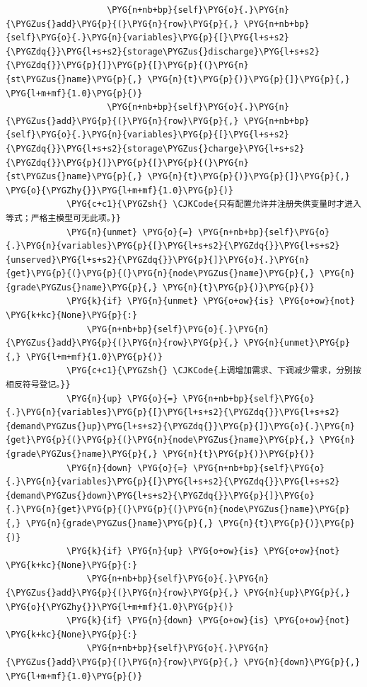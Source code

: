 \begin{Verbatim}
                    \PYG{n+nb+bp}{self}\PYG{o}{.}\PYG{n}{\PYGZus{}add}\PYG{p}{(}\PYG{n}{row}\PYG{p}{,} \PYG{n+nb+bp}{self}\PYG{o}{.}\PYG{n}{variables}\PYG{p}{[}\PYG{l+s+s2}{\PYGZdq{}}\PYG{l+s+s2}{storage\PYGZus{}discharge}\PYG{l+s+s2}{\PYGZdq{}}\PYG{p}{]}\PYG{p}{[}\PYG{p}{(}\PYG{n}{st\PYGZus{}name}\PYG{p}{,} \PYG{n}{t}\PYG{p}{)}\PYG{p}{]}\PYG{p}{,} \PYG{l+m+mf}{1.0}\PYG{p}{)}
                    \PYG{n+nb+bp}{self}\PYG{o}{.}\PYG{n}{\PYGZus{}add}\PYG{p}{(}\PYG{n}{row}\PYG{p}{,} \PYG{n+nb+bp}{self}\PYG{o}{.}\PYG{n}{variables}\PYG{p}{[}\PYG{l+s+s2}{\PYGZdq{}}\PYG{l+s+s2}{storage\PYGZus{}charge}\PYG{l+s+s2}{\PYGZdq{}}\PYG{p}{]}\PYG{p}{[}\PYG{p}{(}\PYG{n}{st\PYGZus{}name}\PYG{p}{,} \PYG{n}{t}\PYG{p}{)}\PYG{p}{]}\PYG{p}{,} \PYG{o}{\PYGZhy{}}\PYG{l+m+mf}{1.0}\PYG{p}{)}
            \PYG{c+c1}{\PYGZsh{} \CJKCode{只有配置允许并注册失供变量时才进入等式；严格主模型可无此项。}}
            \PYG{n}{unmet} \PYG{o}{=} \PYG{n+nb+bp}{self}\PYG{o}{.}\PYG{n}{variables}\PYG{p}{[}\PYG{l+s+s2}{\PYGZdq{}}\PYG{l+s+s2}{unserved}\PYG{l+s+s2}{\PYGZdq{}}\PYG{p}{]}\PYG{o}{.}\PYG{n}{get}\PYG{p}{(}\PYG{p}{(}\PYG{n}{node\PYGZus{}name}\PYG{p}{,} \PYG{n}{grade\PYGZus{}name}\PYG{p}{,} \PYG{n}{t}\PYG{p}{)}\PYG{p}{)}
            \PYG{k}{if} \PYG{n}{unmet} \PYG{o+ow}{is} \PYG{o+ow}{not} \PYG{k+kc}{None}\PYG{p}{:}
                \PYG{n+nb+bp}{self}\PYG{o}{.}\PYG{n}{\PYGZus{}add}\PYG{p}{(}\PYG{n}{row}\PYG{p}{,} \PYG{n}{unmet}\PYG{p}{,} \PYG{l+m+mf}{1.0}\PYG{p}{)}
            \PYG{c+c1}{\PYGZsh{} \CJKCode{上调增加需求、下调减少需求，分别按相反符号登记。}}
            \PYG{n}{up} \PYG{o}{=} \PYG{n+nb+bp}{self}\PYG{o}{.}\PYG{n}{variables}\PYG{p}{[}\PYG{l+s+s2}{\PYGZdq{}}\PYG{l+s+s2}{demand\PYGZus{}up}\PYG{l+s+s2}{\PYGZdq{}}\PYG{p}{]}\PYG{o}{.}\PYG{n}{get}\PYG{p}{(}\PYG{p}{(}\PYG{n}{node\PYGZus{}name}\PYG{p}{,} \PYG{n}{grade\PYGZus{}name}\PYG{p}{,} \PYG{n}{t}\PYG{p}{)}\PYG{p}{)}
            \PYG{n}{down} \PYG{o}{=} \PYG{n+nb+bp}{self}\PYG{o}{.}\PYG{n}{variables}\PYG{p}{[}\PYG{l+s+s2}{\PYGZdq{}}\PYG{l+s+s2}{demand\PYGZus{}down}\PYG{l+s+s2}{\PYGZdq{}}\PYG{p}{]}\PYG{o}{.}\PYG{n}{get}\PYG{p}{(}\PYG{p}{(}\PYG{n}{node\PYGZus{}name}\PYG{p}{,} \PYG{n}{grade\PYGZus{}name}\PYG{p}{,} \PYG{n}{t}\PYG{p}{)}\PYG{p}{)}
            \PYG{k}{if} \PYG{n}{up} \PYG{o+ow}{is} \PYG{o+ow}{not} \PYG{k+kc}{None}\PYG{p}{:}
                \PYG{n+nb+bp}{self}\PYG{o}{.}\PYG{n}{\PYGZus{}add}\PYG{p}{(}\PYG{n}{row}\PYG{p}{,} \PYG{n}{up}\PYG{p}{,} \PYG{o}{\PYGZhy{}}\PYG{l+m+mf}{1.0}\PYG{p}{)}
            \PYG{k}{if} \PYG{n}{down} \PYG{o+ow}{is} \PYG{o+ow}{not} \PYG{k+kc}{None}\PYG{p}{:}
                \PYG{n+nb+bp}{self}\PYG{o}{.}\PYG{n}{\PYGZus{}add}\PYG{p}{(}\PYG{n}{row}\PYG{p}{,} \PYG{n}{down}\PYG{p}{,} \PYG{l+m+mf}{1.0}\PYG{p}{)}

\end{Verbatim}
